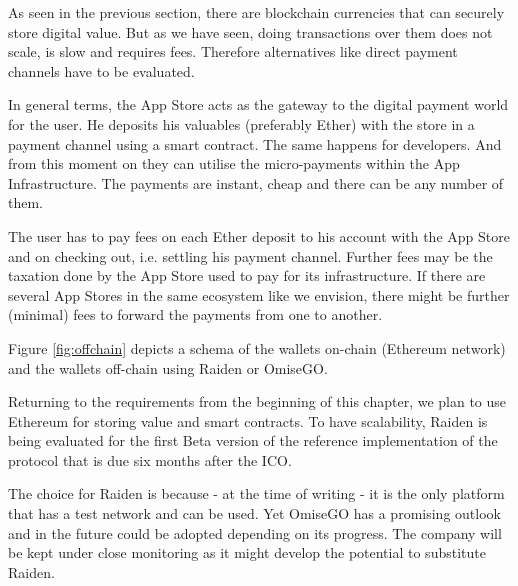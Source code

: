 As seen in the previous section, there are blockchain currencies that can securely store digital value. But as we have seen, doing transactions over them does not scale, is slow and requires fees. Therefore alternatives like direct payment channels have to be evaluated.

\medskip

In general terms, the App Store acts as the gateway to the digital payment world for the user. He deposits his valuables (preferably Ether) with the store in a payment channel using a smart contract. The same happens for developers. And from this moment on they can utilise the micro-payments within the App Infrastructure. The payments are instant, cheap and there can be any number of them.

\medskip

The user has to pay fees on each Ether deposit to his account with the App Store and on checking out, i.e. settling his payment channel. Further fees may be the taxation done by the App Store used to pay for its infrastructure.  If there are several App Stores in the same ecosystem like we envision, there might be further (minimal) fees to forward the payments from one to another.

\medskip

Figure \ref{fig:offchain} depicts a schema of the wallets on-chain (Ethereum network) and the wallets off-chain using Raiden or OmiseGO.


\medskip

Returning to the requirements from the beginning of this chapter, we plan to use Ethereum for storing value and smart contracts. To have scalability, Raiden is being evaluated for the first Beta version of the reference implementation of the protocol that is due six months after the ICO. %

\medskip

The choice for Raiden is because - at the time of writing - it is the only platform that has a test network and can be used. Yet OmiseGO has a promising outlook and in the future could be adopted depending on its progress. The company will be kept under close monitoring as it might develop the potential to substitute Raiden.




